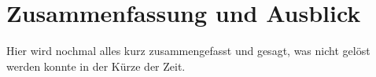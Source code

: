 \chapter{Zusammenfassung und Ausblick}
\label{ZusammenfassungAusblick}
Hier wird nochmal alles kurz zusammengefasst und gesagt, was nicht
gelöst werden konnte in der Kürze der Zeit.
